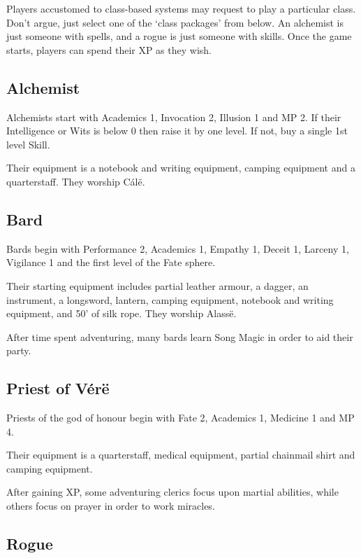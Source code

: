 \begin{multicols}{2}

Players accustomed to class-based systems may request to play a particular class. Don't argue, just select one of the `class packages' from below.  An alchemist is just someone with spells, and a rogue is just someone with skills.  Once the game starts, players can spend their XP as they wish.

\subsection{Alchemist}

Alchemists start with Academics 1, Invocation 2, Illusion 1 and MP 2.  If their Intelligence or Wits is below 0 then raise it by one level.  If not, buy a single 1st level Skill.

Their equipment is a notebook and writing equipment, camping equipment and a quarterstaff. They worship C\'{a}l\"{e}.

\subsection{Bard}

Bards begin with Performance 2, Academics 1, Empathy 1, Deceit 1, Larceny 1, Vigilance 1 and the first level of the Fate sphere.

Their starting equipment includes partial leather armour, a dagger, an instrument, a longsword, lantern, camping equipment, notebook and writing equipment, and 50' of silk rope.  They worship Alass\"{e}.

After time spent adventuring, many bards learn Song Magic in order to aid their party.

\subsection{Priest of V\'{e}r\"{e}}

Priests of the god of honour begin with Fate 2, Academics 1, Medicine 1 and MP 4.

Their equipment is a quarterstaff, medical equipment, partial chainmail shirt and camping equipment.

After gaining XP, some adventuring clerics focus upon martial abilities, while others focus on prayer in order to work miracles.

\subsection{Rogue}


\end{multicols}
